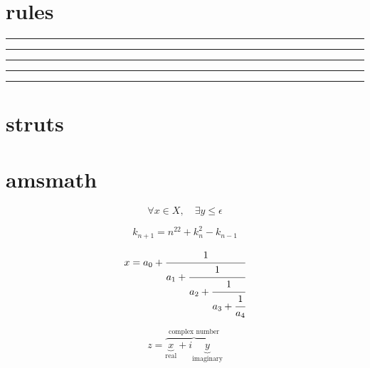 \documentclass{article}
\begin{document}



\section{rules}
\rule{3mm}{.1pt}%
\rule[-1mm]{5mm}{1cm}%
\rule{3mm}{.1pt}%
\rule[1mm]{1cm}{5mm}%
\rule{3mm}{.1pt}

\section{struts}

\section{amsmath}

\begin{displaymath}
\forall x \in X, \quad \exists y \leq \epsilon
\end{displaymath}

\begin{displaymath}
k_{n+1} = n^22 + k_n^2 - k_{n-1}
\end{displaymath}

\begin{equation}
x = a_0 + \cfrac{1}{a_1
+ \cfrac{1}{a_2
+ \cfrac{1}{a_3 + \cfrac{1}{a_4} } } }
\end{equation}

\begin{displaymath}
z = \overbrace{
\underbrace{x}_\text{real} + i
\underbrace{y}_\text{imaginary}
}^\text{complex number}
\end{displaymath}
\end{document}
